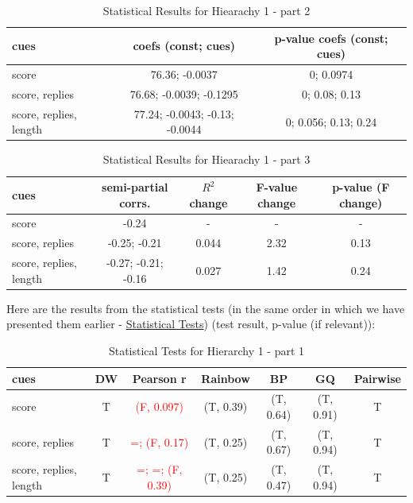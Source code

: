 \documentclass[11pt, oneside]{article}   	%
\begin{document}
\begin{table}[H]
  \begin{center}
  \begin{tabular}{|l|c|c|}
    \hline
    cues & coefs (const; cues) & p-value coefs (const; cues) \\
    \hline
    score & 76.36; -0.0037 & 0; 0.0974 \\
    score, replies & 76.68; -0.0039; -0.1295 & 0; 0.08; 0.13 \\
    score, replies, length & 77.24; -0.0043; -0.13; -0.0044 & 0; 0.056; 0.13; 0.24 \\
    \hline
  \end{tabular}
  \caption{Statistical Results for Hiearachy 1 - part 2}
  \end{center}
\end{table}

\begin{table}[H]
  \begin{center}
  \begin{tabular}{|l|c|c|c|c|}
    \hline
    cues & semi-partial corrs. & $R^2$ change & F-value change & p-value (F change) \\
    \hline
    score & -0.24 & - & - & - \\
    score, replies & -0.25; -0.21 & 0.044 & 2.32 & 0.13 \\
    score, replies, length & -0.27; -0.21; -0.16 & 0.027 & 1.42 & 0.24 \\
    \hline
  \end{tabular}
  \caption{Statistical Results for Hiearachy 1 - part 3}
  \end{center}
\end{table}

Here are the results from the statistical tests (in the same order in which we have presented them earlier - \hyperref[list:stat_tests]{Statistical Tests}) (test result, p-value (if relevant)):
\begin{table}[H]
  \begin{center}
  \begin{tabular}{|l|c|c|c|c|c|c|}
    \hline
    cues & DW & Pearson r & Rainbow & BP & GQ & Pairwise \\
    \hline
    score & T & \textcolor{red}{(F, 0.097)} & (T, 0.39) & (T, 0.64) & (T, 0.91) & T \\
    score, replies & T & \textcolor{red}{=; (F, 0.17)} & (T, 0.25) & (T, 0.67) & (T, 0.94) & T \\
    score, replies, length & T & \textcolor{red}{=; =; (F, 0.39)} & (T, 0.25) & (T, 0.47) & (T, 0.94) & T \\
    \hline
  \end{tabular}
  \caption{Statistical Tests for Hierarchy 1 - part 1}
  \end{center}
\end{table}
\end{document}
